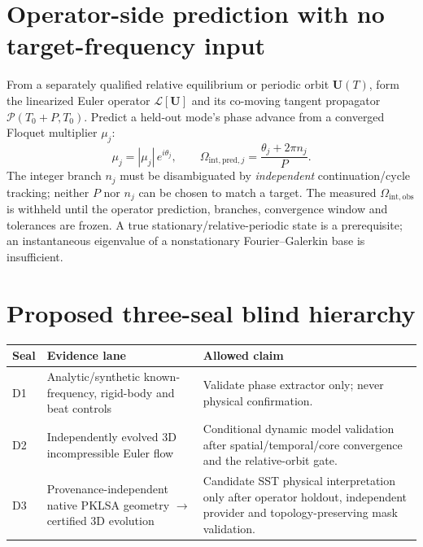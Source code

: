 \documentclass[11pt,a4paper]{article}
\begin{document}
\section{Operator-side prediction with no target-frequency input}
From a separately qualified relative equilibrium or periodic orbit $\mathbf U(T)$, form the linearized Euler operator $\mathcal L[\mathbf U]$ and its co-moving tangent propagator $\mathcal P(T_0+P,T_0)$. Predict a held-out mode's phase advance from a converged Floquet multiplier $\mu_j$:
\begin{equation}
\mu_j=|\mu_j|\,e^{i\theta_j},\qquad
\Omega_{\mathrm{int,pred},j}=\frac{\theta_j+2\pi n_j}{P}.\label{floquet}
\end{equation}
The integer branch $n_j$ must be disambiguated by \emph{independent} continuation/cycle tracking; neither $P$ nor $n_j$ can be chosen to match a target. The measured $\Omega_{\mathrm{int,obs}}$ is withheld until the operator prediction, branches, convergence window and tolerances are frozen. A true stationary/relative-periodic state is a prerequisite; an instantaneous eigenvalue of a nonstationary Fourier--Galerkin base is insufficient.

\section{Proposed three-seal blind hierarchy}
\begin{center}\small\begin{tabular}{p{17mm}p{48mm}p{83mm}}\toprule
Seal & Evidence lane & Allowed claim \\\midrule
D1 & Analytic/synthetic known-frequency, rigid-body and beat controls & Validate phase extractor only; never physical confirmation.\\
D2 & Independently evolved 3D incompressible Euler flow & Conditional dynamic model validation after spatial/temporal/core convergence and the relative-orbit gate.\\
D3 & Provenance-independent native PKLSA geometry $\to$ certified 3D evolution & Candidate SST physical interpretation only after operator holdout, independent provider and topology-preserving mask validation.\\\bottomrule
\end{tabular}\end{center}
\end{document}
